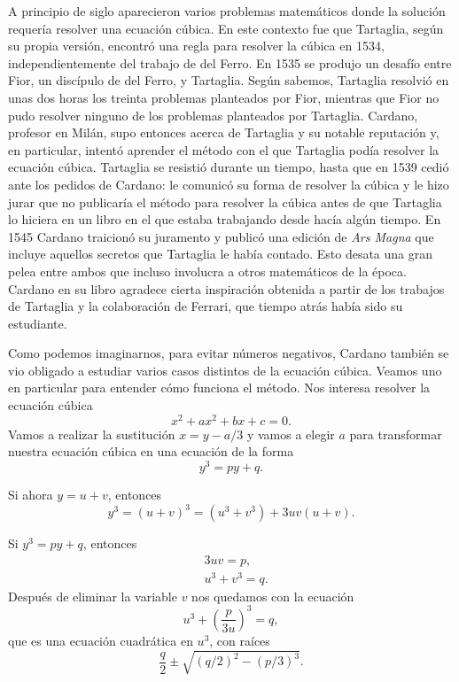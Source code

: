 A principio de siglo aparecieron varios problemas matemáticos donde la solución
requería resolver una ecuación cúbica. En este contexto fue que Tartaglia,
según su propia versión, encontró una regla para resolver la cúbica en 1534,
independientemente del trabajo de del Ferro. En 1535 se produjo un desafío
entre Fior, un discípulo de del Ferro, y Tartaglia.  Según sabemos, Tartaglia
resolvió en unas dos horas los treinta problemas planteados por Fior, mientras
que Fior no pudo resolver ninguno de los problemas planteados por Tartaglia.
Cardano, profesor en Milán, supo entonces acerca de Tartaglia y su notable
reputación y, en particular, intentó aprender el método con el que Tartaglia
podía resolver la ecuación cúbica. Tartaglia se resistió durante un tiempo,
hasta que en 1539 cedió ante los pedidos de Cardano: le comunicó su forma de
resolver la cúbica y le hizo jurar que no publicaría el método para resolver la
cúbica antes de que Tartaglia lo hiciera en un libro en el que estaba
trabajando desde hacía algún tiempo. En 1545 Cardano traicionó su juramento y
publicó una edición de \emph{Ars Magna} que incluye aquellos secretos que
Tartaglia le había contado.  Esto desata una gran pelea entre ambos que incluso
involucra a otros matemáticos de la época. Cardano en su libro  
agradece cierta inspiración obtenida a partir de los trabajos de Tartaglia y la
colaboración de Ferrari, que tiempo atrás había sido su estudiante. 

Como podemos imaginarnos, para evitar números negativos, Cardano también se vio
obligado a estudiar varios casos distintos de la ecuación cúbica. Veamos uno en
particular para entender cómo funciona el método. Nos interesa resolver la
ecuación cúbica
\[
x^2+ax^2+bx+c=0.
\]
Vamos a realizar la sustitución $x=y-a/3$ y vamos a elegir $a$ para transformar
nuestra ecuación cúbica en una ecuación de la forma
\[
	y^3=py+q.
\]

Si ahora $y=u+v$, entonces
\[
	y^3=(u+v)^3=(u^3+v^3)+3uv(u+v).
\]

Si $y^3=py+q$, entonces 
\begin{align*}
	&3uv = p,\\
	&u^3+v^3=q.
\end{align*}
Después de eliminar la variable $v$ nos quedamos con la ecuación
\[
	u^3+\left(\frac{p}{3u}\right)^3=q,
\]
que es una ecuación cuadrática en $u^3$, con raíces
\[
	\frac{q}{2}\pm\sqrt{(q/2)^2-(p/3)^3}.
\]


